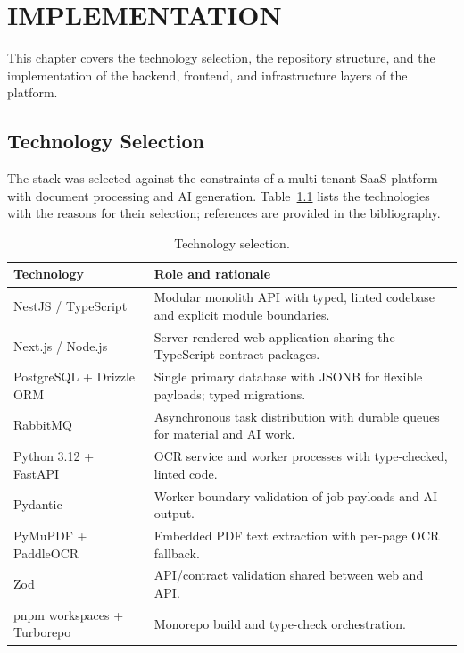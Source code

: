 \chapter{IMPLEMENTATION}
\thispagestyle{empty}

This chapter covers the technology selection, the repository structure, and
the implementation of the backend, frontend, and infrastructure layers of
the platform.

\clearpage

\section{Technology Selection}

The stack was selected against the constraints of a multi-tenant SaaS
platform with document processing and AI generation. Table~\ref{tab:tech}
lists the technologies with the reasons for their selection; references are
provided in the bibliography.

\begin{table}[H]
\centering
\caption{Technology selection.}
\label{tab:tech}
\small
\begin{tabular}{@{}p{4.6cm} p{\dimexpr\textwidth-4.6cm-12pt\relax}@{}}
\toprule
\textbf{Technology} & \textbf{Role and rationale} \\
\midrule
NestJS / TypeScript \cite{nestjs} & Modular monolith API with typed, linted
codebase and explicit module boundaries. \\
Next.js \cite{nextjs} / Node.js \cite{nodejs} & Server-rendered web application
sharing the TypeScript contract packages. \\
PostgreSQL \cite{postgresql} + Drizzle ORM \cite{drizzle} & Single primary
database with JSONB for flexible payloads; typed migrations. \\
RabbitMQ \cite{rabbitmq} & Asynchronous task distribution with durable queues
for material and AI work. \\
Python 3.12 \cite{python} + FastAPI \cite{fastapi} & OCR service and worker
processes with type-checked, linted code. \\
Pydantic \cite{pydantic} & Worker-boundary validation of job payloads and AI
output. \\
PyMuPDF \cite{pymupdf} + PaddleOCR \cite{ppocr,ppocrv3} & Embedded PDF text
extraction with per-page OCR fallback. \\
Zod & API/contract validation shared between web and API. \\
pnpm workspaces + Turborepo & Monorepo build and type-check orchestration. \\
\bottomrule
\end{tabular}
\end{table}

